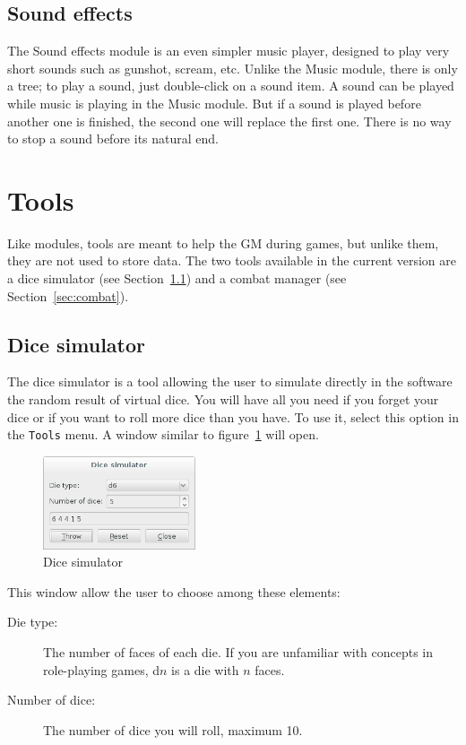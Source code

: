 \documentclass[a4paper,12pt]{article}
\newcommand*{\interfaceitem}[1]{\texttt{#1}}
\begin{document}
\subsection{Sound effects}
\label{sec:fx}

The Sound effects module is an even simpler music player, designed to play very short sounds such as gunshot, scream, etc. Unlike the Music module, there is only a tree; to play a sound, just double-click on a sound item.
A sound can be played while music is playing in the Music module. But if a sound is played before another one is finished, the second one will replace the first one.
There is no way to stop a sound before its natural end.


\section{Tools}
\label{sec:tools}
Like modules, tools are meant to help the GM during games, but unlike them, they are not used to store data. The two tools available in the current version are a dice simulator (see Section~\ref{sec:dice}) and a combat manager (see Section~\ref{sec:combat}).

\subsection{Dice simulator}
\label{sec:dice}

The dice simulator is a tool allowing the user to simulate directly in the software the random result of virtual dice. You will have all you need if you forget your dice or if you want to roll more dice than you have. To use it, select this option in the \interfaceitem{Tools} menu. A window similar to figure~\ref{simulateur_des} will open.
\begin{figure}[ht]
    \centerline{\includegraphics[width=0.4\textwidth]{dice_simulator}}
    \caption{Dice simulator}
    \label{simulateur_des}
\end{figure}

This window allow the user to choose among these elements:
\begin{description}
    \item[Die type:]{The number of faces of each die. If you are unfamiliar with concepts in role-playing games, d$n$ is a die with $n$ faces.}
    \item[Number of dice:]{The number of dice you will roll, maximum 10.}
\end{description}
\end{document}
